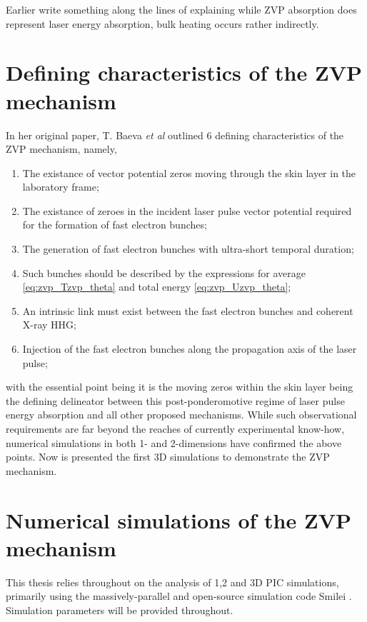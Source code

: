 Earlier write something along the lines of explaining while ZVP absorption does represent laser energy absorption, bulk heating occurs rather indirectly.

\section{Defining characteristics of the ZVP mechanism}
In her original paper, T. Baeva \textit{et al} \cite{baevaZeroVectorPotential2011} outlined 6 defining characteristics of the \ac{ZVP} mechanism, namely,
\begin{enumerate}
	\item The existance of vector potential zeros moving through the skin layer in the laboratory frame;
	\item The existance of zeroes in the incident laser pulse vector potential required for the formation of fast electron bunches;
	\item The generation of fast electron bunches with ultra-short temporal duration;
	\item Such bunches should be described by the expressions for average \ref{eq:zvp_Tzvp_theta} and total energy \ref{eq:zvp_Uzvp_theta};
	\item An intrinsic link must exist between the fast electron bunches and coherent X-ray \ac{HHG};
	\item Injection of the fast electron bunches along the propagation axis of the laser pulse;
\end{enumerate}
with the essential point being it is the moving zeros within the skin layer being the defining delineator between this post-ponderomotive regime of laser pulse energy absorption and all other proposed mechanisms. While such observational requirements are far beyond the reaches of currently experimental know-how, numerical simulations in both 1- \cite{baevaZeroVectorPotential2011} and 2-dimensions \cite{savinAttosecondscaleAbsorptionExtreme2017} have confirmed the above points. Now is presented the first \ac{3D} simulations to demonstrate the \ac{ZVP} mechanism.

\section{Numerical simulations of the ZVP mechanism}
This thesis relies throughout on the analysis of 1,2 and 3D \ac{PIC} simulations, primarily using the massively-parallel and open-source simulation code Smilei \cite{derouillatSmileiCollaborativeOpensource2018}. Simulation parameters will be provided throughout.
